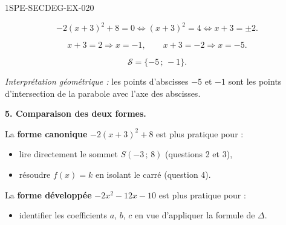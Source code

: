 \begin{corrige}{1SPE-SECDEG-EX-020}

\[-2(x+3)^2 + 8 = 0 \iff (x+3)^2 = 4 \iff x + 3 = \pm 2.\]

\[x + 3 = 2 \Rightarrow x = -1, \qquad x + 3 = -2 \Rightarrow x = -5.\]

\[\boxed{\mathcal{S} = \{-5\,;\,-1\}.}\]

\textit{Interprétation géométrique :} les points d'abscisses $-5$ et $-1$ sont les points d'intersection de la parabole avec l'axe des abscisses.

\medskip
\textbf{5. Comparaison des deux formes.}

La \textbf{forme canonique} $-2(x+3)^2 + 8$ est plus pratique pour :
\begin{itemize}
  \item lire directement le sommet $S(-3\,;\,8)$ (questions 2 et 3),
  \item résoudre $f(x) = k$ en isolant le carré (question 4).
\end{itemize}

La \textbf{forme développée} $-2x^2 - 12x - 10$ est plus pratique pour :
\begin{itemize}
  \item identifier les coefficients $a$, $b$, $c$ en vue d'appliquer la formule de $\Delta$.
\end{itemize}

\end{corrige}
